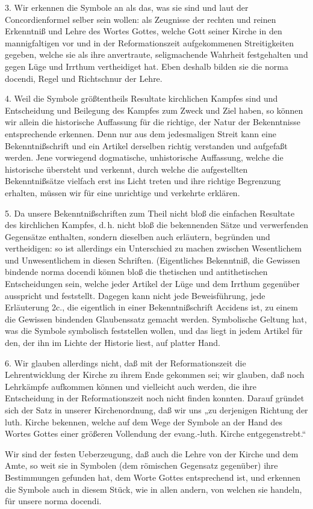 3. Wir erkennen die Symbole an als das, was sie sind und laut der Concordienformel selber sein wollen: als Zeugnisse der rechten und reinen Erkenntniß und Lehre des Wortes Gottes, welche Gott seiner Kirche in den mannigfaltigen vor und in der Reformationszeit aufgekommenen Streitigkeiten gegeben, welche sie als ihre anvertraute, seligmachende Wahrheit festgehalten und gegen Lüge und Irrthum vertheidiget hat. Eben deshalb bilden sie die norma docendi, Regel und Richtschnur der Lehre.

4. Weil die Symbole größtentheils Resultate kirchlichen Kampfes sind und Entscheidung und Beilegung des Kampfes zum Zweck und Ziel haben, so können wir allein die historische Auffassung für die richtige, der Natur der Bekenntnisse entsprechende erkennen. Denn nur aus dem jedesmaligen Streit kann eine Bekenntnißschrift und ein Artikel derselben richtig verstanden und aufgefaßt werden. Jene vorwiegend dogmatische, unhistorische Auffassung, welche die historische übersteht und verkennt, durch welche die aufgestellten Bekenntnißsätze vielfach erst ins Licht treten und ihre richtige Begrenzung erhalten, müssen wir für eine unrichtige und verkehrte erklären.

5. Da unsere Bekenntnißschriften zum Theil nicht bloß die einfachen Resultate des kirchlichen Kampfes, d.\,h. nicht bloß die bekennenden Sätze und verwerfenden Gegensätze enthalten, sondern dieselben auch erläutern, begründen und vertheidigen: so ist allerdings ein Unterschied zu machen zwischen Wesentlichem und Unwesentlichem in diesen Schriften. (Eigentliches Bekenntniß, die Gewissen bindende norma docendi können bloß die thetischen
und antithetischen Entscheidungen sein, welche jeder Artikel der Lüge und dem Irrthum gegenüber ausspricht und feststellt. Dagegen kann nicht jede Beweisführung, jede Erläuterung 2c., die eigentlich in einer Bekenntnißschrift Accidens ist, zu einem die Gewissen bindenden Glaubenssatz gemacht werden. Symbolische Geltung hat, was die Symbole symbolisch feststellen wollen, und das liegt in jedem Artikel für den, der ihn im Lichte der Historie liest, auf platter Hand.

6. Wir glauben allerdings nicht, daß mit der Reformationszeit die Lehrentwicklung der Kirche zu ihrem Ende gekommen sei; wir glauben, daß noch Lehrkämpfe aufkommen können und vielleicht auch werden, die ihre Entscheidung in der Reformationszeit noch nicht finden konnten. Darauf gründet sich der Satz in unserer Kirchenordnung, daß wir uns „zu derjenigen Richtung der luth. Kirche bekennen, welche auf dem Wege der Symbole an der Hand des Wortes Gottes einer größeren Vollendung der evang.-luth. Kirche entgegenstrebt.“

Wir sind der festen Ueberzeugung, daß auch die Lehre von der Kirche und dem Amte, so weit sie in Symbolen (dem römischen Gegensatz gegenüber) ihre Bestimmungen gefunden hat, dem Worte Gottes entsprechend ist, und erkennen die Symbole auch in diesem Stück, wie in allen andern, von welchen sie handeln, für unsere norma docendi.
